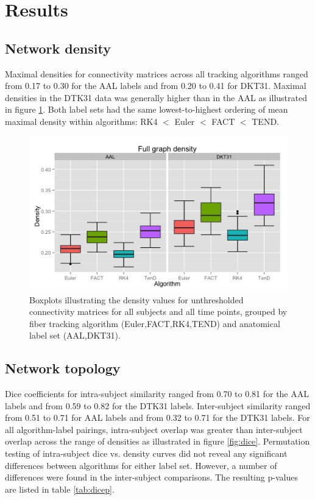 \documentclass{frontiersSCNS} %
\begin{document}

\section{Results}
\subsection{Network density}
Maximal densities for connectivity matrices across all tracking
algorithms ranged from 0.17 to 0.30 for the AAL labels and from 0.20 to
0.41 for DKT31. Maximal densities in the DTK31 data was generally
higher than in the AAL as illustrated in figure
\ref{fig:density}. Both label sets had the same lowest-to-highest
ordering of mean maximal density within algorithms: RK4 $<$ Euler $<$
FACT $<$ TEND.


\begin{figure}
\begin{center}
\includegraphics[width=0.5\linewidth]{figures/density_plot.png} 
\caption{Boxplots illustrating the density values for unthresholded connectivity matrices for all subjects and all time points, grouped by fiber tracking algorithm (Euler,FACT,RK4,TEND) and anatomical label set (AAL,DKT31).}
\label{fig:density}
\end{center}
\end{figure}

\subsection{Network topology}
Dice coefficients for intra-subject similarity ranged from 0.70 to
0.81 for the AAL labels and from 0.59 to 0.82 for the DTK31
labels. Inter-subject similarity ranged from 0.51 to 0.71 for AAL
labels and from 0.32 to 0.71 for the DTK31 labels. For all
algorithm-label pairings, intra-subject overlap was greater than
inter-subject overlap across the range of densities as illustrated in
figure \ref{fig:dice}. Permutation testing of intra-subject dice
vs. density curves did not reveal any significant differences between
algorithms for either label set. However, a number of differences were
found in the inter-subject comparisons. The resulting p-values are
listed in table \ref{tab:dicep}. 
\end{document}
